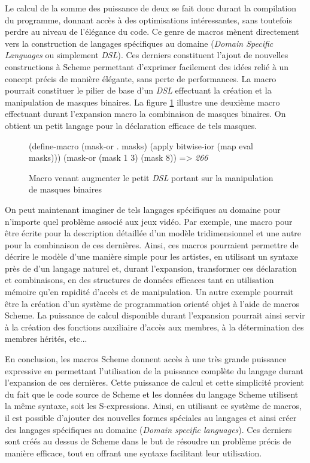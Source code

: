 \documentclass[12pt,oneside,letterpaper,francais]{book}
\newcommand{\scheme}[1]{\selectlanguage{english}{\tt #1}\selectlanguage{french}}
\newcommand{\schemeresult}[1]{{\it #1}}
\begin{document}
Le calcul de la somme des puissance de deux se fait donc durant la
compilation du programme, donnant accès à des optimisations
intéressantes, sans toutefois perdre au niveau de l'élégance du
code. Ce genre de macros mènent directement vers la construction de
langages spécifiques au domaine (\textit{Domain Specific Languages} ou
simplement \textit{DSL}). Ces derniers constituent l'ajout de
nouvelles constructions à Scheme permettant d'exprimer facilement des
idées relié à un concept précis de manière élégante, sans perte de
performances. La macro \scheme{mask} pourrait constituer le pilier de
base d'un \textit{DSL} effectuant la création et la manipulation de
masques binaires. La figure \ref{Scheme:macro-mini-dsl} illustre une
deuxième macro effectuant durant l'expansion macro la combinaison de
masques binaires. On obtient un petit langage pour la déclaration
efficace de tels masques. 

\begin{figure}[htb1]
  \begin{schemecode}
(define-macro (mask-or . masks)
  (apply bitwise-ior (map eval masks)))
(mask-or (mask 1 3) (mask 8)) => \schemeresult{266}
  \end{schemecode}
  \caption{Macro venant augmenter le petit \textit{DSL} portant sur la
    manipulation de masques binaires}
  \label{Scheme:macro-mini-dsl}
\end{figure}

On peut maintenant imaginer de tels langages spécifiques au domaine
pour n'importe quel problème associé aux jeux vidéo. Par exemple, une
macro pour être écrite pour la description détaillée d'un modèle
tridimensionnel et une autre pour la combinaison de ces
dernières. Ainsi, ces macros pourraient permettre de décrire le modèle
d'une manière simple pour les artistes, en utilisant un syntaxe près
de d'un langage naturel et, durant l'expansion, transformer ces
déclaration et combinaisons, en des structures de données efficaces
tant en utilisation mémoire qu'en rapidité d'accès et de
manipulation. Un autre exemple pourrait être la création d'un système
de programmation orienté objet à l'aide de macros Scheme. La puissance
de calcul disponible durant l'expansion pourrait ainsi servir à la
création des fonctions auxiliaire d'accès aux membres, à la
détermination des membres hérités, etc...

En conclusion, les macros Scheme donnent accès à une très grande
puissance expressive en permettant l'utilisation de la puissance
complète du langage durant l'expansion de ces dernières. Cette
puissance de calcul et cette simplicité provient du fait que le code
source de Scheme et les données du langage Scheme utilisent la même
syntaxe, soit les S-expressions. Ainsi, en utilisant ce système de
macros, il est possible d'ajouter des nouvelles formes spéciales au
langages et ainsi créer des langages spécifiques au domaine
(\textit{Domain specific languages}). Ces derniers sont créés au
dessus de Scheme dans le but de résoudre un problème précis de manière
efficace, tout en offrant une syntaxe facilitant leur utilisation.
\end{document}
